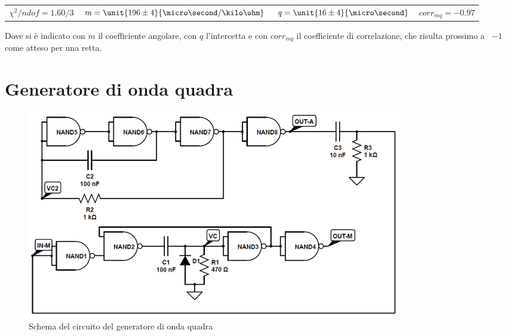 \documentclass[a4paper,10pt]{article}
\begin{document}
\begin{table}[H]
	\centering
	\begin{tabular}{cccc}
		$\chi^2/ndof = 1.60/3$ & $m = \unit{196 \pm 4}{\micro\second / \kilo\ohm}$ & $q = \unit{16 \pm 4}{\micro\second}$ & $corr_{mq} = -0.97$\\
	\end{tabular}
\end{table}

Dove si è indicato con $m$ il coefficiente angolare, con $q$ l'intercetta e con $corr_{mq}$ il coefficiente di correlazione, che risulta prossimo a ~$-1$ come atteso per una retta.

\section{Generatore di onda quadra}

\begin{figure}[H]
	\centering
	\includegraphics[width=0.8\textwidth]{../grafici/SqGen.png}
	\caption{Schema del circuito del generatore di onda quadra}
	\label{fig:SQGEN}
\end{figure}
\end{document}
